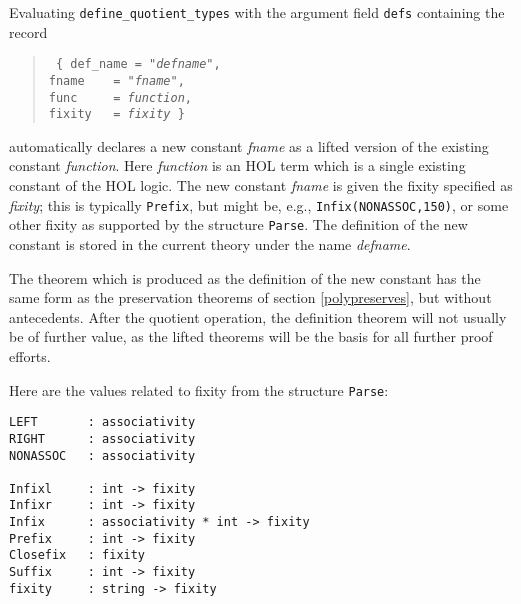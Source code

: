 \documentclass[envcountsame,runningheads]{llncs}
\begin{document}
Evaluating {\tt define\_quotient\_types} with the
argument
field {\tt defs}
containing the record
\begin{verse} \tt
\hspace{\parindent}
\hspace{2.0cm}
\{
def\_name = "{\it defname}", \\
\hspace{2.0cm}
fname \ \ \ = "{\it fname}", \\
\hspace{2.0cm}
func \ \ \ \ = {\it function}, \\
\hspace{2.0cm}
fixity \ \ = {\it fixity} \} \\
\end{verse}

\noindent
automatically declares a new constant {\it fname}
as a lifted version of the existing constant {\it function}.
Here {\it function} is an HOL term which is a single existing constant
of the HOL logic.
The new constant {\it fname} is given the fixity specified as {\it fixity};
this is typically {\tt Prefix}, but might be, e.g.,
{\tt Infix(NONASSOC,150)},
or some other fixity
as supported by the structure {\tt Parse}.
The definition of the new constant is stored in the current theory
under the name {\it defname}.

The theorem which is produced as the definition of the new constant
has the same form as the preservation theorems of section \ref{polypreserves},
but without antecedents.
After the quotient operation,
the definition theorem will not usually be of further value, as
the lifted theorems will be the basis for all further proof efforts.

Here are the values related to fixity from the structure {\tt Parse}:
\begin{verbatim}
LEFT       : associativity
RIGHT      : associativity
NONASSOC   : associativity

Infixl     : int -> fixity
Infixr     : int -> fixity
Infix      : associativity * int -> fixity
Prefix     : int -> fixity
Closefix   : fixity
Suffix     : int -> fixity
fixity     : string -> fixity
\end{verbatim}
\end{document}
